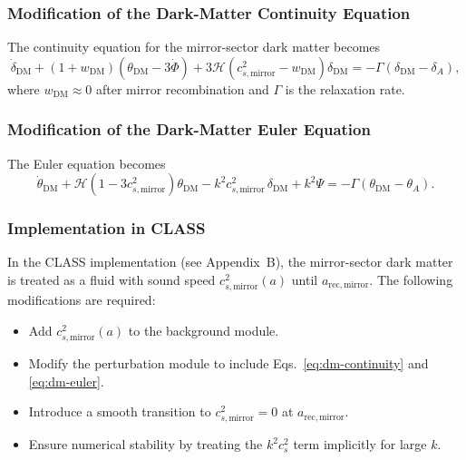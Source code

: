\documentclass[11pt,a4paper]{article}
\begin{document}
\subsubsection{Modification of the Dark-Matter Continuity Equation}

The continuity equation for the mirror-sector dark matter becomes
\begin{equation}
\dot{\delta}_{\mathrm{DM}}
+
(1+w_{\mathrm{DM}})\left(\theta_{\mathrm{DM}} - 3\dot{\Phi}\right)
+
3\mathcal{H}\left(c_{s,\mathrm{mirror}}^{2} - w_{\mathrm{DM}}\right)\delta_{\mathrm{DM}}
=
- \Gamma \left(\delta_{\mathrm{DM}} - \delta_{A}\right),
\label{eq:dm-continuity}
\end{equation}
where $w_{\mathrm{DM}} \approx 0$ after mirror recombination and $\Gamma$ is the relaxation rate.

\subsubsection{Modification of the Dark-Matter Euler Equation}

The Euler equation becomes
\begin{equation}
\dot{\theta}_{\mathrm{DM}}
+
\mathcal{H}\left(1 - 3c_{s,\mathrm{mirror}}^{2}\right)\theta_{\mathrm{DM}}
-
k^{2}c_{s,\mathrm{mirror}}^{2}\,\delta_{\mathrm{DM}}
+
k^{2}\Psi
=
- \Gamma\left(\theta_{\mathrm{DM}} - \theta_{A}\right).
\label{eq:dm-euler}
\end{equation}

\subsubsection{Implementation in CLASS}

In the CLASS implementation (see Appendix~B), the mirror-sector dark matter is treated as
a fluid with sound speed $c_{s,\mathrm{mirror}}^{2}(a)$ until $a_{\mathrm{rec,mirror}}$. The following
modifications are required:

\begin{itemize}
\item Add $c_{s,\mathrm{mirror}}^{2}(a)$ to the background module.
\item Modify the perturbation module to include Eqs.~\eqref{eq:dm-continuity} and
\eqref{eq:dm-euler}.
\item Introduce a smooth transition to $c_{s,\mathrm{mirror}}^{2}=0$ at $a_{\mathrm{rec,mirror}}$.
\item Ensure numerical stability by treating the $k^{2}c_{s}^{2}$ term implicitly for large $k$.
\end{itemize}
\end{document}
